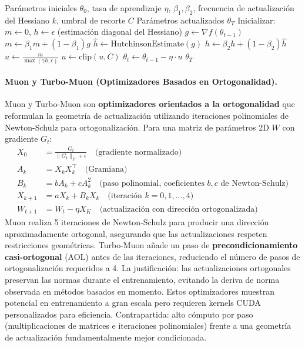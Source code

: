 \documentclass[11pt,a4paper]{article}
\begin{document}
\begin{algorithm}[H]
\caption{Sophia (Hessiano Diagonal con Actualizaciones Recortadas)}
\label{alg:sophia}
\begin{algorithmic}[1]
\Require Parámetros iniciales $\theta_0$, tasa de aprendizaje $\eta$, $\beta_1, \beta_2$, frecuencia de actualización del Hessiano $k$, umbral de recorte $C$ 
\Ensure Parámetros actualizados $\theta_T$
\State Inicializar: $m \gets 0$, $h \gets \epsilon$ (estimación diagonal del Hessiano)
    \State $g \gets \nabla f(\theta_{t-1})$
    \State $m \gets \beta_1 m + (1-\beta_1) g$ 
        \State $\hat{h} \gets \text{HutchinsonEstimate}(g)$ 
        \State $h \gets \beta_2 h + (1-\beta_2) \hat{h}$ 
    \EndIf
    \State $u \gets \frac{m}{\max(\gamma h, \epsilon)}$ 
    \State $u \gets \text{clip}(u, C)$ 
    \State $\theta_t \gets \theta_{t-1} - \eta \cdot u$
\EndFor
\Return $\theta_T$
\end{algorithmic}
\end{algorithm}

\paragraph{Muon y Turbo-Muon (Optimizadores Basados en Ortogonalidad).}
Muon y Turbo-Muon son \textbf{optimizadores orientados a la ortogonalidad} que reformulan la geometría de actualización utilizando iteraciones polinomiales de Newton-Schulz para ortogonalización. Para una matriz de parámetros 2D $W$ con gradiente $G_t$:
\begin{align}
X_0 &= \frac{G_t}{\|G_t\|_F + \epsilon} \quad\text{(gradiente normalizado)} \\
A_k &= X_k X_k^\top \quad\text{(Gramiana)} \\
B_k &= b A_k + c A_k^2 \quad\text{(paso polinomial, coeficientes $b, c$ de Newton-Schulz)} \\
X_{k+1} &= a X_k + B_k X_k \quad\text{(iteración $k=0,1,\ldots,4$)} \\
W_{t+1} &= W_t - \eta X_K \quad\text{(actualización con dirección ortogonalizada)}
\end{align}
Muon realiza 5 iteraciones de Newton-Schulz para producir una dirección aproximadamente ortogonal, asegurando que las actualizaciones respeten restricciones geométricas. Turbo-Muon añade un paso de \textbf{precondicionamiento casi-ortogonal} (AOL) antes de las iteraciones, reduciendo el número de pasos de ortogonalización requeridos a 4. La justificación: las actualizaciones ortogonales preservan las normas durante el entrenamiento, evitando la deriva de norma observada en métodos basados en momento. Estos optimizadores muestran potencial en entrenamiento a gran escala pero requieren kernels CUDA personalizados para eficiencia. Contrapartida: alto cómputo por paso (multiplicaciones de matrices e iteraciones polinomiales) frente a una geometría de actualización fundamentalmente mejor condicionada.
\end{document}
